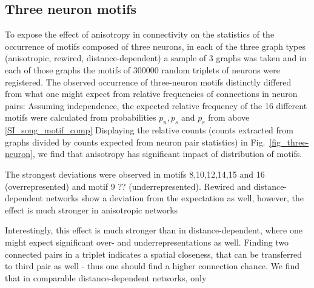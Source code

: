 \clearpage
\pagebreak
\newpage
\subsection*{Three neuron motifs}



To expose the effect of anisotropy in connectivity on the statistics
of the occurrence of motifs composed of three neurons, in each of the
three graph types (anisotropic, rewired, distance-dependent) a sample
of 3 graphs was taken and in each of those graphs the motifs of 300000
random triplets of neurons were registered. %
The observed occurrence of three-neuron motifs distinctly differed
from what one might expect from relative frequencies of connections in
neuron pairs: Assuming independence, the expected relative frequency
of the 16 different motifs were calculated from probabilities $p_u,
p_s$ and $p_r$ from above %
\ref{SI_song_motif_comp}%
Displaying the relative counts (counts extracted from graphs divided
by counts expected from neuron pair statistics) in
Fig.~\ref{fig_three-neuron}, we find that anisotropy has significant
impact of distribution of motifs. 

The strongest deviations were
observed in motifs 8,10,12,14,15 and 16 (overrepresented) and motif 9 ??
(underrepresented). Rewired and distance-dependent networks show a
deviation from the expectation as well, however, the effect is much
stronger in anisotropic networks

Interestingly, this effect is much stronger than in
distance-dependent, where one might expect significant over- and
underrepresentations as well. Finding two connected pairs in a triplet
indicates a spatial closeness, that can be transferred to third pair
as well - thus one should find a higher connection chance. We find
that in comparable distance-dependent networks, only


